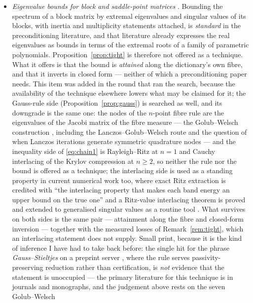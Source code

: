 \documentclass[11pt]{article}
\theoremstyle{remark}
\begin{document}
\begin{itemize}\itemsep1pt
\item \emph{Eigenvalue bounds for block and saddle-point matrices}
\cite{bradley2021,bergamaschi2026,bergamaschi2025,helanow2023}. Bounding the spectrum of a block
matrix by extremal eigenvalues and singular values of its blocks, with inertia and
multiplicity statements attached, is \emph{standard} in the preconditioning literature, and
that literature already expresses the real eigenvalues as bounds in terms of the extremal
roots of a family of parametric polynomials. Proposition~\ref{prop:tight} is therefore not
offered as a technique. What it offers is that the bound is \emph{attained} along the
dictionary's own fibre, and that it inverts in closed form --- neither of which a
preconditioning paper needs. This item was added in the round that ran the search, because
the availability of the technique elsewhere lowers what may be claimed for it; the
Gauss-rule side (Proposition~\ref{prop:gauss}) is searched as well, and its downgrade is the same one:
the nodes of the $n$-point fibre rule are the eigenvalues of the Jacobi matrix of the fibre measure ---
the Golub--Welsch construction \cite{golubwelsch1969,vanassche2023,webb2026,zheng2026,li2024},
including the Lanczos--Golub--Welsch route \cite{zheng2026} and the question of when
Lanczos iterations generate symmetric quadrature nodes \cite{li2024} --- and the inequality side of \eqref{eq:chain1}
is Rayleigh--Ritz at $n=1$ and Cauchy interlacing of the Krylov compression at $n\ge2$, so neither the
rule nor the bound is offered as a technique; the interlacing side is used as a standing property in
current numerical work too, where exact Ritz extraction is credited with ``the interlacing property
that makes each band energy an upper bound on the true one'' \cite{gubler2026} and a Ritz-value
interlacing theorem is proved and extended to generalised singular values as a routine tool
\cite{fang2026}. What survives on both sides is the same pair --- attainment
along the fibre and closed-form inversion --- together with the measured losses of
Remark~\ref{rem:tight}, which an interlacing statement does not supply. Small print, because it is the
kind of inference I have had to take back before: the single hit for the phrase \emph{Gauss--Stieltjes}
on a preprint server \cite{tudela2026}, where the rule serves passivity-preserving reduction rather than
certification, is \emph{not} evidence that the statement is unoccupied --- the primary literature for
this technique is in journals and monographs, and the judgement above rests on the seven Golub--Welsch

\end{itemize}
\end{document}
